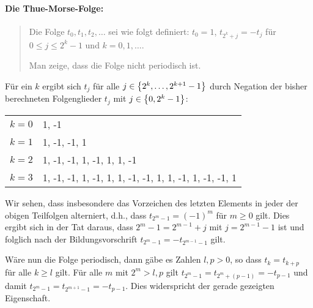\documentclass[11pt,a4paper]{article}
\begin{document}
\paragraph{Die Thue-Morse-Folge:}
\begin{quote}
  Die Folge $t_0,t_1,t_2,\dots$ sei wie folgt definiert: $t_0=1$,
  $t_{2^k+j}=-t_j$ für $0\le j\le 2^k-1$ und $k=0,1,\dots$.

  Man zeige, dass die Folge nicht periodisch ist.
\end{quote}
\begin{loesung}
  Für ein $k$ ergibt sich $t_j$ für alle $j\in\left\{2^k,\dots,2^{k+1}-1\right\}$ durch
  Negation der bisher berechneten Folgenglieder $t_j$ mit $j\in\left\{0,2^k-1\right\}$:
  \begin{center}
    \begin{tabular}{c|l} 
      $k=0$ & 1, -1\\
      $k=1$ & 1, -1, -1, 1\\
      $k=2$ & 1, -1, -1, 1, -1, 1, 1, -1\\
      $k=3$ & 1, -1, -1, 1, -1, 1, 1, -1, -1, 1, 1, -1, 1, -1, -1, 1\\
    \end{tabular}  
  \end{center}

  Wir sehen, dass insbesondere das Vorzeichen des letzten Elements in jeder der
  obigen Teilfolgen alterniert, d.h., dass $t_{2^m-1}=(-1)^m$ für $m\ge 0$
  gilt.  Dies ergibt sich in der Tat daraus, dass $2^m-1=2^{m-1}+j$ mit
  $j=2^{m-1}-1$ ist und folglich nach der Bildungsvorschrift
  $t_{2^m-1}=-t_{2^{m-1}-1}$ gilt.

  Wäre nun die Folge periodisch, dann gäbe es Zahlen $l,p>0$, so dass
  $t_{k}=t_{k+p}$ für alle $k\ge l$ gilt.  Für alle $m$ mit $2^m>l,p$ gilt
  $t_{2^m-1}=t_{2^m+(p-1)}=-t_{p-1}$ und damit
  $t_{2^m-1}=t_{2^{m+1}-1}=-t_{p-1}$.  Dies widerspricht der gerade gezeigten
  Eigenschaft.   
\end{loesung}
\end{document}
